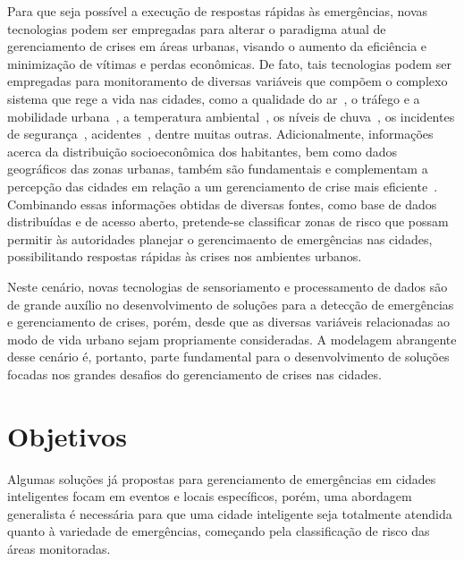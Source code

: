 \begin{refsection}
Para que seja possível a execução de respostas rápidas às emergências, novas tecnologias podem ser empregadas para alterar o paradigma atual de gerenciamento de crises em áreas urbanas, visando o aumento da eficiência e minimização de vítimas e perdas econômicas. De fato, tais tecnologias podem ser empregadas para monitoramento de diversas variáveis que compõem o complexo sistema que rege a vida nas cidades, como a qualidade do ar~\cite{Silva_2019}, o tráfego e a mobilidade urbana~\cite{Calderoni_2014}, a temperatura ambiental~\cite{silva2020climifba}, os níveis de chuva~\cite{Xu_2016}, os incidentes de segurança~\cite{Alkhatib2019771}, acidentes~\cite{Thompson_2010}, dentre muitas outras. Adicionalmente, informações acerca da distribuição socioeconômica dos habitantes, bem como dados geográficos das zonas urbanas, também são fundamentais e complementam a percepção das cidades em relação a um gerenciamento de crise mais eficiente~\cite{KONTOKOSTA2018272}. Combinando essas informações obtidas de diversas fontes, como base de dados distribuídas e de acesso aberto, pretende-se classificar zonas de risco que possam permitir às autoridades planejar o gerencimaento de emergências nas cidades, possibilitando respostas rápidas às crises nos ambientes urbanos. %

Neste cenário, novas tecnologias de sensoriamento e processamento de dados são de grande auxílio no desenvolvimento de soluções para a detecção de emergências e gerenciamento de crises, porém, desde que as diversas variáveis relacionadas ao modo de vida urbano sejam propriamente consideradas. A modelagem abrangente desse cenário é, portanto, parte fundamental para o desenvolvimento de soluções focadas nos grandes desafios do gerenciamento de crises nas cidades.

\section{Objetivos}\label{sec:objetivos}

Algumas soluções já propostas para gerenciamento de emergências em cidades inteligentes focam em eventos e locais específicos, porém, uma abordagem generalista é necessária para que uma cidade inteligente seja totalmente atendida quanto à variedade de emergências, começando pela classificação de risco das áreas monitoradas. %


\end{refsection}
